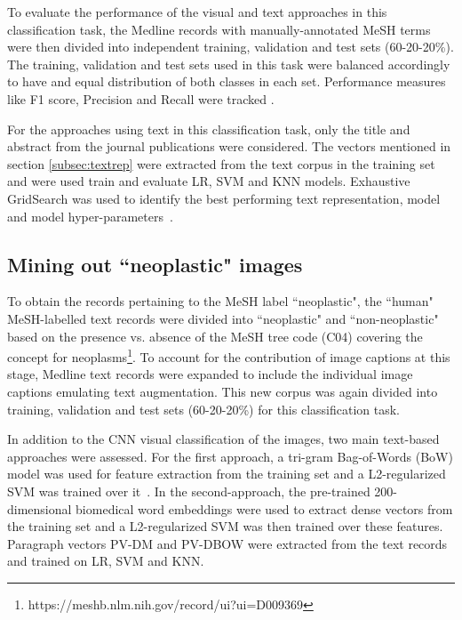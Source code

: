 \documentclass[]{spie}  %
\begin{document}
To evaluate the performance of the visual and text approaches in this classification task, the Medline records with manually-annotated MeSH terms were then divided into independent training, validation and test sets (60-20-20\%).
The training, validation and test sets used in this task were balanced accordingly to have and equal distribution of both classes in each set.
Performance measures like F1 score, Precision and Recall were tracked .

For the approaches using text in this classification task, only the title and abstract from the journal publications were considered.
The vectors mentioned in section \ref{subsec:textrep} were extracted from the text corpus in the training set and were used train and evaluate LR, SVM and KNN models.
Exhaustive GridSearch was used to identify the best performing text representation, model and model hyper-parameters~\cite{chicco2017ten}.
%
\setcounter{footnote}{0}
%
\subsection{Mining out ``neoplastic" images} 
\label{subsubsec:step3}
%
To obtain the records pertaining to the MeSH label ``neoplastic", the ``human" MeSH-labelled text records were divided into ``neoplastic" 
and ``non-neoplastic" 
based on the presence vs. absence of the MeSH tree code (C04) covering the concept for neoplasms\footnote{https://meshb.nlm.nih.gov/record/ui?ui=D009369}. 
To account for the contribution of image captions at this stage, Medline text records were expanded to include the individual image captions emulating text augmentation.
This new corpus was again divided into training,  validation and test sets (60-20-20\%) for this classification task.

In addition to the CNN visual classification of the images, two main text-based approaches were assessed. 
For the first approach, a tri-gram Bag-of-Words (BoW) model was used for feature extraction from the training set and a L2-regularized SVM was trained over it~\cite{tfidfBow}.
In the second-approach, the pre-trained 200-dimensional biomedical word embeddings were used to extract dense vectors from the training set\cite{bio2vec} and a L2-regularized SVM was then trained over these features.
Paragraph vectors PV-DM and PV-DBOW were extracted from the text records and trained on LR, SVM and KNN.
%
\end{document}
